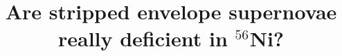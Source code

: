 \documentclass[twocolumn, linenumbers]{aastex62}
\begin{document}
\title{Are stripped envelope supernovae really deficient in $^{56}$Ni?}



\end{document}
